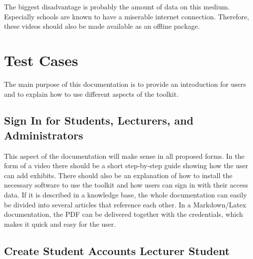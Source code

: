 \vspace{0.5cm}

The biggest disadvantage is probably the amount of data on this medium. Especially schools are known to have a miserable internet connection. Therefore, these videos should also be made available as an offline package.


\section{Test Cases}

The main purpose of this documentation is to provide an introduction for users and to explain how to use different aspects of the toolkit.

\subsection{Sign In for Students, Lecturers, and Administrators}

This aspect of the documentation will make sense in all proposed forms. In the form of a video there should be a short step-by-step guide showing how the user can add exhibits. There should also be an explanation of how to install the necessary software to use the toolkit and how users can sign in with their access data. If it is described in a knowledge base, the whole documentation can easily be divided into several articles that reference each other. In a Markdown/Latex documentation, the PDF can be delivered together with the credentials, which makes it quick and easy for the user.

\subsection{Create Student Accounts Lecturer Student}